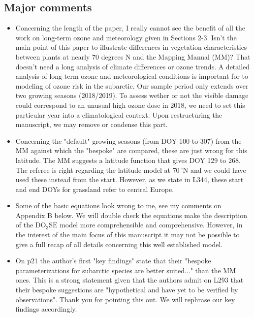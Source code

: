 \documentclass{scrartcl}
\begin{document}
\subsection*{Major comments} 
\begin{itemize}
    
    \item {\color{blue}Concerning the length of the paper, I really cannot see the benefit of all the work on long-term ozone and meteorology given in Sections 2-3. Isn't the main point of this paper to illustrate differences in vegetation characteristics between plants at nearly 70 degrees N and the Mapping Manual (MM)? That doesn't need a long analysis of climate differences or ozone trends.} A detailed analysis of long-term ozone and meteorological conditions is important for to modeling of ozone risk in the subarctic. Our sample period only extends over two growing seasons (2018/2019). To assess wether or not the visible damage could correspond to an unusual high ozone dose in 2018, we need to set this particular year into a climatological context. Upon restructuring the manuscript, we may remove or condense this part.
    
    \item {\color{blue}Concerning the "default" growing seasons (from DOY 100 to 307) from the MM against which the "bespoke" are compared, these are just wrong for this latitude. The MM suggests a latitude function that gives DOY 129 to 268.} The referee is right regarding the latitude model at $70\,^\circ$N and we could have used these instead from the start. However, as we state in L344, these start and end DOYs for grassland refer to central Europe.
    
    \item {\color{blue}Some of the basic equations look wrong to me, see my comments on Appendix B below.} We will double check the equations make the description of the $\mathrm{DO_3SE}$ model more comprehensible and comprehensive. However, in the interest of the main focus of this manuscript it may not be possible to give a full recap of all details concerning this well established model.
    
    \item {\color{blue}On p21 the author's first "key findings" state that their "bespoke parameterizations for subarctic species are better suited..." than the MM ones. This is a strong statement given that the authors admit on L293 that their bespoke suggestions are "hypothetical and have yet to be verified by observations".} Thank you for pointing this out. We will rephrase our key findings accordingly.

\end{itemize}
\end{document}

